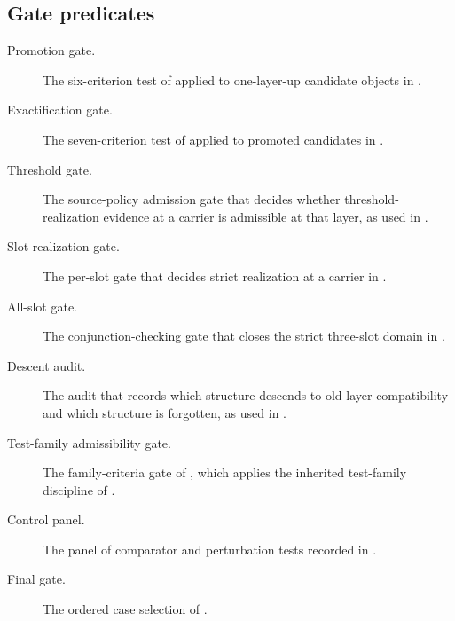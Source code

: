 \documentclass[11pt]{article}
\theoremstyle{definition}
\begin{document}
\subsection{Gate predicates}\label{subsec:gate-predicates-list}

\begin{description}
\item[Promotion gate.]
The six-criterion test of \cite{Tsiokos2026PromotionCriteria} applied to
one-layer-up candidate objects in
.

\item[Exactification gate.]
The seven-criterion test of \cite{Tsiokos2026CarrierExactification} applied to
promoted candidates in .

\item[Threshold gate.]
The source-policy admission gate that decides whether threshold-realization
evidence at a carrier is admissible at that layer, as used in
.

\item[Slot-realization gate.]
The per-slot gate that decides strict realization at a carrier in
.

\item[All-slot gate.]
The conjunction-checking gate that closes the strict three-slot domain in
.

\item[Descent audit.]
The audit that records which structure descends to old-layer compatibility and
which structure is forgotten, as used in .

\item[Test-family admissibility gate.]
The family-criteria gate of , which applies
the inherited test-family discipline of \cite{Tsiokos2026CarrierToEvent}.

\item[Control panel.]
The panel of comparator and perturbation tests recorded in
.

\item[Final gate.]
The ordered case selection of .
\end{description}
\end{document}
